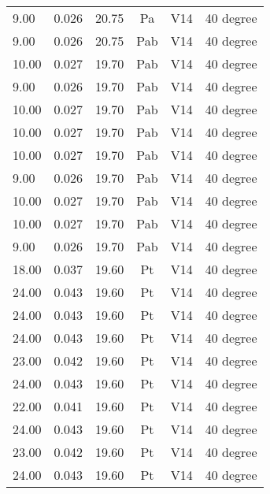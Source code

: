 \begin{table}[t]
\begin{tabular}{l | l | l | c | c | l}
9.00           & 0.026           & 20.75  & Pa       & V14    & 40 degree           \\
9.00           & 0.026           & 20.75  & Pab      & V14    & 40 degree           \\
10.00          & 0.027           & 19.70  & Pab      & V14    & 40 degree           \\
9.00           & 0.026           & 19.70  & Pab      & V14    & 40 degree           \\
10.00          & 0.027           & 19.70  & Pab      & V14    & 40 degree           \\
10.00          & 0.027           & 19.70  & Pab      & V14    & 40 degree           \\
10.00          & 0.027           & 19.70  & Pab      & V14    & 40 degree           \\
9.00           & 0.026           & 19.70  & Pab      & V14    & 40 degree           \\
10.00          & 0.027           & 19.70  & Pab      & V14    & 40 degree           \\
10.00          & 0.027           & 19.70  & Pab      & V14    & 40 degree           \\
9.00           & 0.026           & 19.70  & Pab      & V14    & 40 degree           \\
18.00          & 0.037           & 19.60  & Pt       & V14    & 40 degree           \\
24.00          & 0.043           & 19.60  & Pt       & V14    & 40 degree           \\
24.00          & 0.043           & 19.60  & Pt       & V14    & 40 degree           \\
24.00          & 0.043           & 19.60  & Pt       & V14    & 40 degree           \\
23.00          & 0.042           & 19.60  & Pt       & V14    & 40 degree           \\
24.00          & 0.043           & 19.60  & Pt       & V14    & 40 degree           \\
22.00          & 0.041           & 19.60  & Pt       & V14    & 40 degree           \\
24.00          & 0.043           & 19.60  & Pt       & V14    & 40 degree           \\
23.00          & 0.042           & 19.60  & Pt       & V14    & 40 degree           \\
24.00          & 0.043           & 19.60  & Pt       & V14    & 40 degree          
\end{tabular}
\end{table}
    
\clearpage